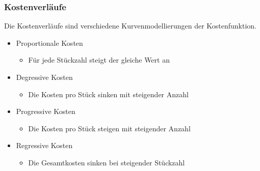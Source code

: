 \documentclass{article}
\begin{document}
	\subsubsection{Kostenverläufe}
	Die Kostenverläufe sind verschiedene Kurvenmodellierungen der Kostenfunktion. 
	\begin{itemize}
		\item{Proportionale Kosten}
		\begin{itemize}
			\item{Für jede Stückzahl steigt der gleiche Wert an}
		\end{itemize}
		\item{Degressive Kosten}
		\begin{itemize}
			\item{Die Kosten pro Stück sinken mit steigender Anzahl}
		\end{itemize}
		\item{Progressive Kosten}
		\begin{itemize}
			\item{Die Kosten pro Stück steigen mit steigender Anzahl}
		\end{itemize}
		\item{Regressive Kosten}
		\begin{itemize}
			\item{Die Gesamtkosten sinken bei steigender Stückzahl}
		\end{itemize}
	\end{itemize}
\end{document}
